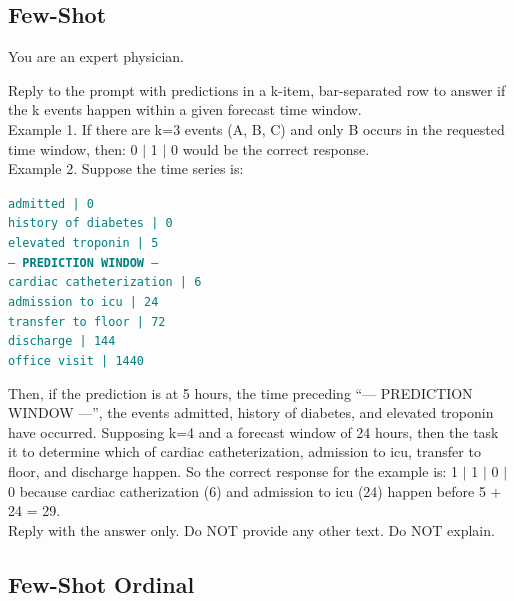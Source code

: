 \subsection{Few-Shot}
\begin{tcolorbox}[colback=gray!5, colframe=gray!100, title=Prompt, boxrule=2pt]

{You are an expert physician.}

{Reply to the prompt with predictions in a k-item, bar-separated row to answer if the k events happen within a given forecast time window. \\

Example 1. If there are k=3 events (A, B, C) and only B occurs in the requested time window, then:
0 $\mid$ 1 $\mid$ 0
would be the correct response.}\\

{Example 2. Suppose the time series is:}

\noindent \texttt{\textcolor{teal}
{admitted | 0 \\
history of diabetes | 0 \\
elevated troponin | 5 \\
--- \textbf{PREDICTION WINDOW} --- \\
cardiac catheterization | 6 \\
admission to icu | 24 \\ 
transfer to floor | 72\\ 
discharge | 144\\ 
office visit | 1440}
}

{Then, if the prediction is at 5 hours, the time preceding ``--- PREDICTION WINDOW ---'', the events admitted, history of diabetes, and elevated troponin have occurred.  Supposing k=4 and a forecast window of 24 hours, then the task it to determine which of cardiac catheterization, admission to icu, transfer to floor, and discharge happen. So the correct response for the example is:
1 $\mid$ 1 $\mid$ 0 $\mid$ 0
because cardiac catherization (6) and admission to icu (24) happen before 5 + 24 = 29.}\\

{Reply with the answer only. Do NOT provide any other text. Do NOT explain.}

\end{tcolorbox}

\subsection{Few-Shot Ordinal}

